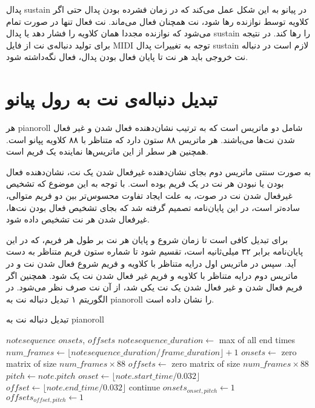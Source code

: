 پدال \gls{sustain} در پیانو به این شکل عمل می‌کند که در زمان فشرده بودن پدال حتی
اگر کلاویه توسط نوازنده رها شود، نت همچنان فعال می‌ماند. نت فعال تنها در صورت
تمام می‌شود که نوازنده مجددا همان کلاویه را فشار دهد یا پدال \gls{sustain} را
رها کند. در نتیجه برای تولید دنباله‌ی نت از فایل \gls{MIDI} توجه به تغییرات پدال
\gls{sustain} لازم است در دنباله نت خروجی باید هر نت تا پایان فعال بودن پدال،
فعال نگه‌داشته شود.

\section{تبدیل دنباله‌ی نت به رول پیانو}
هر \gls{pianoroll} شامل دو ماتریس است که به ترتیب نشان‌دهنده فعال شدن و غیر فعال
شدن نت‌ها می‌باشند. هر ماتریس ۸۸ ستون دارد که متناظر با ۸۸ کلاویه پپانو است.
همچنین هر سطر از این ماتریس‌ها نماینده یک فریم است.

به صورت سنتی ماتریس دوم بجای نشان‌دهنده غیرفعال شدن یک نت، نشان‌دهنده فعال بودن
یا نبودن هر نت در یک فریم بوده است. با توجه به این موضوع که تشخیص غیرفعال شدن نت
در صوت، به علت ایجاد تفاوت محسوس‌تر بین دو فریم متوالی، ساده‌تر است، در این
پایان‌نامه تصمیم گرفته شد که بجای تشخیص فعال بودن نت‌ها، غیرفعال شدن هر نت تشخیص
داده شود.

برای تبدیل کافی است تا زمان شروع و پایان هر نت بر طول هر فریم، که در این
پایان‌نامه برابر ۳۲ میلی‌ثانیه است، تقسیم شود تا شماره ستون فریم متناظر به دست
آید. سپس در ماتریس اول درایه متناظر با کلاویه و فریم شروع فعال شدن نت و در
ماتریس دوم درایه متناظر با کلاویه و فریم غیر فعال شدن نت یک شود. همچنین اگر فریم
فعال شدن و غیر فعال شدن یک نت یکی شد، از آن نت صرف نظر می‌شود. در الگوریتم ۱
تبدیل دنباله نت به \gls{pianoroll} را نشان داده است.

\begin{algorithm}[ht]
\caption{تبدیل دنباله نت به \gls{pianoroll}}
\begin{algorithmic}
\begin{latin}
    \Require $notesequence$
    \Ensure $onsets$, $offsets$
    \State $notesequence\_duration \leftarrow$ max of all end times
    \State $num\_frames \leftarrow \lfloor notesequence\_duration / frame\_duration \rfloor + 1$
    \State $onsets \leftarrow$ zero matrix of size $num\_frames \times 88$
    \State $offsets \leftarrow$ zero matrix of size $num\_frames \times 88$
        \State $pitch \leftarrow note.pitch$
        \State $onset \leftarrow \lfloor note.start\_time / 0.032 \rfloor$
        \State $offset \leftarrow \lfloor note.end\_time / 0.032 \rfloor$
            \State continue
        \EndIf
        \State $onsets_{onset, pitch} \leftarrow 1$
        \State $offsets_{offset, pitch} \leftarrow 1$
    \EndFor
\end{latin}
\end{algorithmic}
\end{algorithm}

